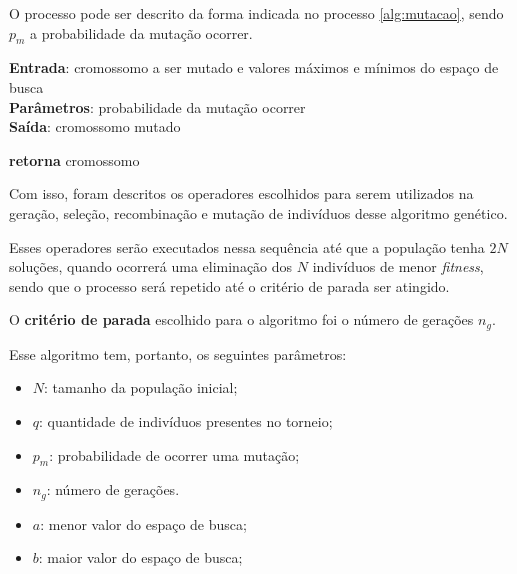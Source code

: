 \documentclass[a4paper, 12pt]{article}
\renewcommand{\Return}{\textbf{retorna}\xspace}
\newenvironment{brprocess}[1][]
  {\begin{algorithm}[#1]
     \selectlanguage{brazilian}%
     \floatname{algorithm}{Processo}%
     \renewcommand{\algorithmicif}{\textbf{se}}%
     \renewcommand{\algorithmicfor}{\textbf{para}}%
     \renewcommand{\algorithmicdo}{\textbf{faça}}%
     \renewcommand{\algorithmicthen}{\textbf{faça}}%
     \renewcommand{\algorithmicend}{\textbf{fim}}%
     \renewcommand{\algorithmicwhile}{\textbf{enquanto}}%
     \renewcommand{\algorithmicelse}{\textbf{caso contrário}}%
  }
  {\end{algorithm}}
\begin{document}
O processo pode ser descrito da forma indicada no processo \ref{alg:mutacao}, sendo $p_m$ a probabilidade da mutação ocorrer.
\begin{brprocess}[!ht]
    \cprotect\caption{Operador de mutação (\verb|mutacao_uniforme(cromossomo|,
    \verb|p_mutacao|, \verb|a|, \verb|b|)}
    \textbf{Entrada}: cromossomo a ser mutado e valores máximos e mínimos do espaço de busca\\
    \textbf{Parâmetros}: probabilidade da mutação ocorrer\\
    \textbf{Saída}: cromossomo mutado
    \begin{algorithmic}
                \EndIf
                \EndIf
            \EndWhile
        \EndIf
        \State \Return cromossomo
    \end{algorithmic}
    \label{alg:mutacao}
\end{brprocess}

Com isso, foram descritos os operadores escolhidos para serem utilizados na geração, seleção, recombinação e mutação de indivíduos desse algoritmo genético.

Esses operadores serão executados nessa sequência até que a população tenha $2N$ soluções, quando ocorrerá uma eliminação dos $N$ indivíduos de menor \textit{fitness}, sendo que o processo será repetido até o critério de parada ser atingido. 

O \textbf{critério de parada} escolhido para o algoritmo foi o número de gerações $n_g$. 

Esse algoritmo tem, portanto, os seguintes parâmetros:
\begin{itemize}
    \item $N$: tamanho da população inicial;
    \item $q$: quantidade de indivíduos presentes no torneio;
    \item $p_m$: probabilidade de ocorrer uma mutação;
    \item $n_g$: número de gerações.
    \item $a$: menor valor do espaço de busca;
    \item $b$: maior valor do espaço de busca;
\end{itemize}
\end{document}
